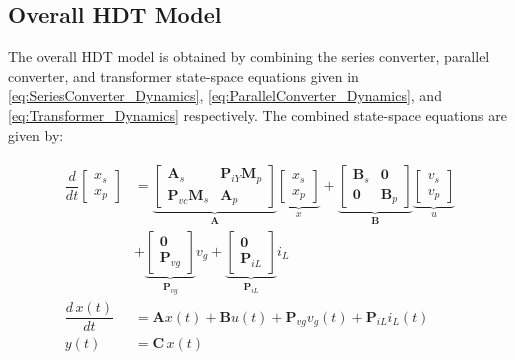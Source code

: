 \subsection{Overall HDT Model}

The overall HDT model is obtained by combining the series converter, parallel converter, and transformer state-space equations given in \eqref{eq:SeriesConverter_Dynamics}, \eqref{eq:ParallelConverter_Dynamics}, and \eqref{eq:Transformer_Dynamics} respectively. The combined state-space equations are given by:

\begin{align}
    \begin{aligned}
        \dfrac{d}{dt}
        \begin{bmatrix}
            x_s\\
            x_p
        \end{bmatrix}
        &=
        \underbrace{
        \begin{bmatrix}
            \mathbf{A}_s & \mathbf{P}_{iY}\mathbf{M}_p \\
            \mathbf{P}_{vc}\mathbf{M}_s & \mathbf{A}_p
        \end{bmatrix}
        }_{\mathbf{A}}
        \underbrace{
        \begin{bmatrix}
            x_s\\
            x_p
        \end{bmatrix}
        }_{x}
        +
        \underbrace{
        \begin{bmatrix}
            \mathbf{B}_s & \mathbf{0} \\
            \mathbf{0} & \mathbf{B}_p
        \end{bmatrix}
        }_{\mathbf{B}}
        \underbrace{
        \begin{bmatrix}
            v_s\\
            v_p 
        \end{bmatrix}
        }_{u}
        \\
        &+
        \underbrace{
        \begin{bmatrix}
            \mathbf{0}\\
            \mathbf{P}_{vg}
        \end{bmatrix}
        }_{\mathbf{P}_{vg}}
        v_g
        +
        \underbrace{
        \begin{bmatrix}
            \mathbf{0}\\
            \mathbf{P}_{iL}
        \end{bmatrix}
        }_{\mathbf{P}_{iL}}
        i_L\\
        \dfrac{d\, x(t)}{dt} &= \mathbf{A}x(t) + \mathbf{B}u(t) + \mathbf{P}_{vg}v_g(t) + \mathbf{P}_{iL}i_L(t)\\
        y(t) &= \mathbf{C}\,x(t)
    \end{aligned}
\end{align}
